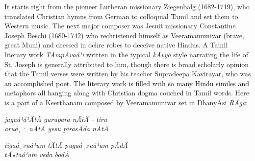 It starts right from the pioneer Lutheran missionary Ziegenbalg (1682-1719), who translated Christian hymns from German to colloquial Tamil and set them to Western music. The next major composer was Jesuit missionary Constantine Joseph Beschi (1680-1742) who rechristened himself as Veeramamunivar (brave, great Muni) and dressed in ochre robes to deceive native Hindus. A Tamil literary work \textit{TÄmpÄvaá¹i }written in the typical \textit{kÄvya} style narrating the life of St. Joseph is generally attributed to him, though there is broad scholarly opinion that the Tamil verses were written by his teacher Supradeepa Kavirayar, who was an accomplished poet. The literary work is filled with so many Hindu similes and metaphors all hanging along with Christian dogma couched in Tamil words. Here is a part of a Keerthanam composed by Veeramamunivar set in DhanyÄsi \textit{RÄga}:

\begin{myquote}
\hspace{2cm}\textit{jagaá¹á¹ÄtÄ gurupara nÄtÄ - tiru \\\hspace{2cm} aruá¸· nÄtÄ yesu pirasÄda nÄtÄ }
\end{myquote}

\begin{myquote}
\hspace{2cm}\textit{tigaá¸»uá¹um tÄtÄ pugaá¸»uá¹um pÄdÄ\\\hspace{2cm} tÄ«taá¹um veda bodÄ}
\end{myquote}

\begin{myquote}
\hspace{2cm}
\end{myquote}

